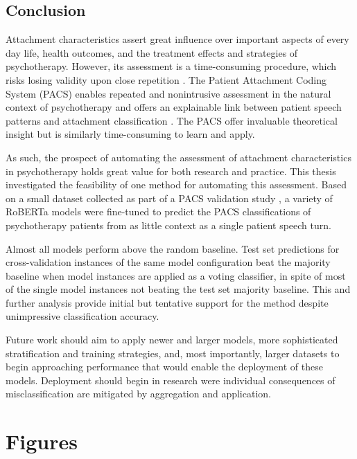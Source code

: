 \documentclass[12pt]{report}
\begin{document}
\section{Conclusion}
Attachment characteristics assert great influence over important aspects of every day life, health outcomes, and the treatment effects and strategies of psychotherapy.
However, its assessment is a time-consuming procedure, which risks losing validity upon close repetition \cite{Daniel2015,Hesse1999}.
The Patient Attachment Coding System (PACS) enables repeated and nonintrusive assessment in the natural context of psychotherapy and offers an explainable link between patient speech patterns and attachment classification \cite{Talia2017,Talia2014}.
The PACS offer invaluable theoretical insight but is similarly time-consuming to learn and apply.

As such, the prospect of automating the assessment of attachment characteristics in psychotherapy holds great value for both research and practice.
This thesis investigated the feasibility of one method for automating this assessment.
Based on a small dataset collected as part of a PACS validation study \cite{Talia2017}, a variety of RoBERTa models \cite{roberta} were fine-tuned to predict the PACS classifications of psychotherapy patients from as little context as a single patient speech turn.

Almost all models perform above the random baseline.
Test set predictions for cross-validation instances of the same model configuration beat the majority baseline when model instances are applied as a voting classifier, in spite of most of the single model instances not beating the test set majority baseline.
This and further analysis provide initial but tentative support for the method despite unimpressive classification accuracy.

Future work should aim to apply newer and larger models, more sophisticated stratification and training strategies, and, most importantly, larger datasets to begin approaching performance that would enable the deployment of these models.
Deployment should begin in research were individual consequences of misclassification are mitigated by aggregation and application.



\appendix
\chapter{Figures}
\label{App: Figures}
\end{document}
